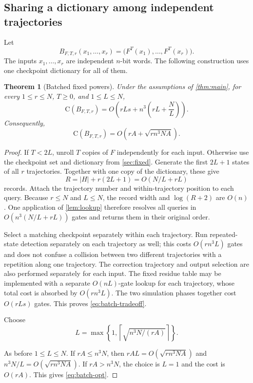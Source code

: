\documentclass[11pt]{article}
\newtheorem{theorem}{Theorem}[section]
\theoremstyle{definition}
\theoremstyle{remark}
\newcommand{\CC}{\mathrm{C}}
\newcommand{\ceil}[1]{\left\lceil #1\right\rceil}
\numberwithin{equation}{section}
\begin{document}
\subsection{Sharing a dictionary among independent trajectories}
\label{sec:batch}

Let
\[
  B_{F,T,r}(x_1,\ldots,x_r)
   =\bigl(F^T(x_1),\ldots,F^T(x_r)\bigr).
\]
The inputs $x_1,\ldots,x_r$ are independent $n$-bit words.  The following
construction uses one checkpoint dictionary for all of them.

\begin{theorem}[Batched fixed powers]\label{thm:batch}
Under the assumptions of \cref{thm:main}, for every $1\leq r\leq N$,
$T\geq 0$, and $1\leq L\leq N$,
\begin{equation}\label{eq:batch-tradeoff}
  \CC(B_{F,T,r})
   =O\!\left(rLs+n^3\left(rL+\frac{N}{L}\right)\right).
\end{equation}
Consequently,
\begin{equation}\label{eq:batch-opt}
  \CC(B_{F,T,r})
   =O\!\left(rA+\sqrt{rn^3NA}\right).
\end{equation}
\end{theorem}

\begin{proof}
If $T<2L$, unroll $T$ copies of $F$ independently for each
input.  Otherwise use the checkpoint set and dictionary from
\cref{sec:fixed}.  Generate the first $2L+1$ states of all $r$ trajectories.
Together with one copy of the dictionary, these give
\[
  R=|H|+r(2L+1)=O(N/L+rL)
\]
records.  Attach the trajectory number and within-trajectory position to
each query.  Because $r\leq N$ and $L\leq N$, the record width and
$\log(R+2)$ are $O(n)$.  One application of \cref{lem:lookup} therefore
resolves all queries in $O(n^3(N/L+rL))$ gates and returns them in their
original order.

Select a matching checkpoint separately within each trajectory.  Run
repeated-state detection separately on each trajectory as well; this
costs $O(rn^3L)$ gates and does not confuse a collision between two
different trajectories with a repetition along one trajectory.
The correction trajectory and output selection are also performed
separately for each input.  The fixed residue table may be implemented
with a separate $O(nL)$-gate lookup for each trajectory, whose total
cost is absorbed by $O(rn^3L)$.  The two simulation phases together cost
$O(rLs)$ gates.  This proves \cref{eq:batch-tradeoff}.

\begin{samepage}
Choose
\[
  L=\max\left\{1,\ceil{\sqrt{n^3N/(rA)}}\right\}.
\]
\end{samepage}
As before $1\leq L\leq N$.  If $rA\leq n^3N$, then
$rAL=O(\sqrt{rn^3NA})$ and $n^3N/L=O(\sqrt{rn^3NA})$.
If $rA>n^3N$, the choice is $L=1$ and the cost is $O(rA)$.
This gives \cref{eq:batch-opt}.
\end{proof}
\end{document}
